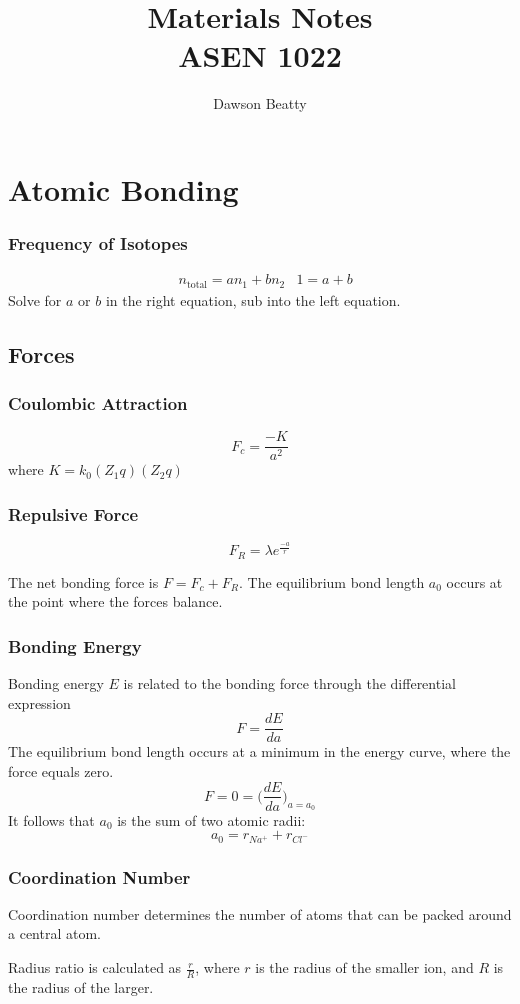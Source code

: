 \documentclass[10pt,letterpaper]{article}
\author{Dawson Beatty}
\title{Materials Notes \\ ASEN 1022}
\begin{document}
	\maketitle
	\section{Atomic Bonding}
	\subsubsection*{Frequency of Isotopes}
	\begin{align*}
		& n_{\text{total}} = an_1 + bn_2 & 1 = a + b
	\end{align*}
	Solve for $a$ or $b$ in the right equation, sub into the left equation. 
	\subsection*{Forces}
	\subsubsection*{Coulombic Attraction}
	$$
	F_c = \frac{-K}{a^2}
	$$
	where $K = k_0(Z_1 q)(Z_2 q)$
	\subsubsection*{Repulsive Force}
	$$
	F_R = \lambda e^{\frac{-a}{r}}
	$$
	
	The net bonding force is $F = F_c + F_R$. The equilibrium bond length $a_0$ occurs at the point where the forces balance.
	\subsubsection*{Bonding Energy}
	Bonding energy $E$ is related to the bonding force through the differential expression 
	$$
	F = \frac{dE}{da}
	$$
	The equilibrium bond length occurs at a minimum in the energy curve, where the force equals zero. 
	$$
	F = 0 = \bigg(\frac{dE}{da} \bigg)_{a=a_0}
	$$
	It follows that $a_0$ is the sum of two atomic radii: 
	$$
	a_0 = r_{Na^+}+r_{Cl^-}
	$$
	\subsubsection*{Coordination Number}
	Coordination number determines the number of atoms that can be packed around a central atom. 
	
	Radius ratio is calculated as $\frac{r}{R}$, where $r$ is the radius of the smaller ion, and $R$ is the radius of the larger. 
\end{document}
